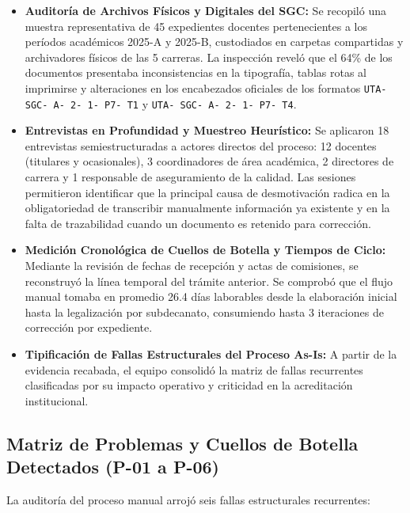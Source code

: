 \documentclass[12pt,a4paper]{article}
\begin{document}
\begin{itemize}[leftmargin=1.5em, itemsep=4pt]
    \item \textbf{Auditoría de Archivos Físicos y Digitales del SGC:} Se recopiló una muestra representativa de 45 expedientes docentes pertenecientes a los períodos académicos 2025-A y 2025-B, custodiados en carpetas compartidas y archivadores físicos de las 5 carreras. La inspección reveló que el 64\% de los documentos presentaba inconsistencias en la tipografía, tablas rotas al imprimirse y alteraciones en los encabezados oficiales de los formatos \texttt{UTA- SGC- A- 2- 1- P7- T1} y \texttt{UTA- SGC- A- 2- 1- P7- T4}.
    \item \textbf{Entrevistas en Profundidad y Muestreo Heurístico:} Se aplicaron 18 entrevistas semiestructuradas a actores directos del proceso: 12 docentes (titulares y ocasionales), 3 coordinadores de área académica, 2 directores de carrera y 1 responsable de aseguramiento de la calidad. Las sesiones permitieron identificar que la principal causa de desmotivación radica en la obligatoriedad de transcribir manualmente información ya existente y en la falta de trazabilidad cuando un documento es retenido para corrección.
    \item \textbf{Medición Cronológica de Cuellos de Botella y Tiempos de Ciclo:} Mediante la revisión de fechas de recepción y actas de comisiones, se reconstruyó la línea temporal del trámite anterior. Se comprobó que el flujo manual tomaba en promedio 26.4 días laborables desde la elaboración inicial hasta la legalización por subdecanato, consumiendo hasta 3 iteraciones de corrección por expediente.
    \item \textbf{Tipificación de Fallas Estructurales del Proceso As-Is:} A partir de la evidencia recabada, el equipo consolidó la matriz de fallas recurrentes clasificadas por su impacto operativo y criticidad en la acreditación institucional.
\end{itemize}

\subsection{Matriz de Problemas y Cuellos de Botella Detectados (P-01 a P-06)}
La auditoría del proceso manual arrojó seis fallas estructurales recurrentes:
\end{document}
